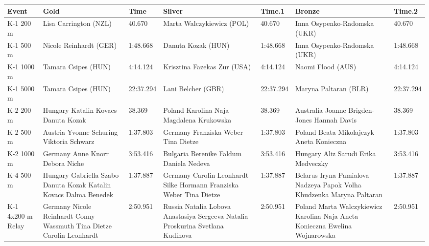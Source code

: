 \documentclass{article}
\begin{document}
\begin{tabular}{lllllll}
\toprule
Event & Gold & Time & Silver & Time.1 & Bronze & Time.2 \\
\midrule
K-1 200 m & Lisa Carrington (NZL) & 40.670 & Marta Walczykiewicz (POL) & 40.670 & Inna Osypenko-Radomska (UKR) & 40.670 \\
K-1 500 m & Nicole Reinhardt (GER) & 1:48.668 & Danuta Kozak (HUN) & 1:48.668 & Inna Osypenko-Radomska (UKR) & 1:48.668 \\
K-1 1000 m & Tamara Csipes (HUN) & 4:14.124 & Krisztina Fazekas Zur (USA) & 4:14.124 & Naomi Flood (AUS) & 4:14.124 \\
K-1 5000 m & Tamara Csipes (HUN) & 22:37.294 & Lani Belcher (GBR) & 22:37.294 & Maryna Paltaran (BLR) & 22:37.294 \\
K-2 200 m & Hungary Katalin Kovacs Danuta Kozak & 38.369 & Poland Karolina Naja Magdalena Krukowska & 38.369 & Australia Joanne Brigden-Jones Hannah Davis & 38.369 \\
K-2 500 m & Austria Yvonne Schuring Viktoria Schwarz & 1:37.803 & Germany Franziska Weber Tina Dietze & 1:37.803 & Poland Beata Mikolajczyk Aneta Konieczna & 1:37.803 \\
K-2 1000 m & Germany Anne Knorr Debora Niche & 3:53.416 & Bulgaria Berenike Faldum Daniela Nedeva & 3:53.416 & Hungary Aliz Sarudi Erika Medveczky & 3:53.416 \\
K-4 500 m & Hungary Gabriella Szabo Danuta Kozak Katalin Kovacs Dalma Benedek & 1:37.887 & Germany Carolin Leonhardt Silke Hormann Franziska Weber Tina Dietze & 1:37.887 & Belarus Iryna Pamialova Nadzeya Papok Volha Khudzenka Maryna Paltaran & 1:37.887 \\
K-1 4x200 m Relay & Germany Nicole Reinhardt Conny Wassmuth Tina Dietze Carolin Leonhardt & 2:50.951 & Russia Natalia Lobova Anastasiya Sergeeva Natalia Proskurina Svetlana Kudinova & 2:50.951 & Poland Marta Walczykiewicz Karolina Naja Aneta Konieczna Ewelina Wojnarowska & 2:50.951 \\
\bottomrule
\end{tabular}
\end{document}
